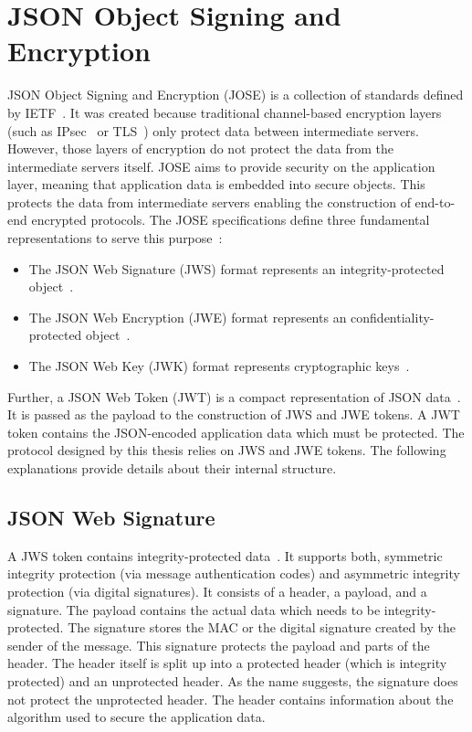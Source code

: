 \documentclass[../main.tex]{subfiles}
\begin{document}
\section{JSON Object Signing and Encryption}
\label{sec:jose}
JSON Object Signing and Encryption (JOSE) is a collection of standards defined by IETF~\cite{Barnes2014}.
It was created because traditional channel-based encryption layers (such as IPsec~\cite{IPSEC2011} or TLS~\cite{TLS2018}) only protect data between intermediate servers.
However, those layers of encryption do not protect the data from the intermediate servers itself.
JOSE aims to provide security on the application layer, meaning that application data is embedded into secure objects.
This protects the data from intermediate servers enabling the construction of end-to-end encrypted protocols.
The JOSE specifications define three fundamental representations to serve this purpose~\cite{Barnes2014}:
\begin{itemize}
    \item The JSON Web Signature (JWS) format represents an integrity-protected object~\cite{JWS2015}.
    \item The JSON Web Encryption (JWE) format represents an confidentiality-protected object~\cite{JWE2015}.
    \item The JSON Web Key (JWK) format represents cryptographic keys~\cite{JWK2015}.
\end{itemize}
Further, a JSON Web Token (JWT) is a compact representation of JSON data~\cite{JWT2015}.
It is passed as the payload to the construction of JWS and JWE tokens.
A JWT token contains the JSON-encoded application data which must be protected.
The protocol designed by this thesis relies on JWS and JWE tokens.
The following explanations provide details about their internal structure.

\subsection{JSON Web Signature}
A JWS token contains integrity-protected data~\cite{JWS2015}.
It supports both, symmetric integrity protection (via message authentication codes) and asymmetric integrity protection (via digital signatures).
It consists of a header, a payload, and a signature.
The payload contains the actual data which needs to be integrity-protected.
The signature stores the MAC or the digital signature created by the sender of the message.
This signature protects the payload and parts of the header.
The header itself is split up into a protected header (which is integrity protected) and an unprotected header.
As the name suggests, the signature does not protect the unprotected header.
The header contains information about the algorithm used to secure the application data.
\end{document}

